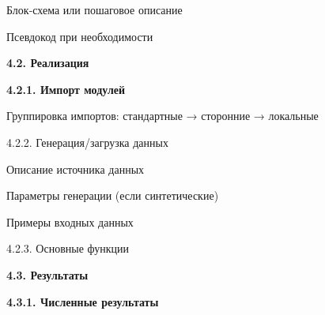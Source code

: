 \documentclass{article}%
\begin{document}
\begin{flushleft}%
Блок-схема или пошаговое описание%
%
\end{flushleft}%
\begin{flushleft}%
Псевдокод при необходимости%
%
\end{flushleft}%
\begin{flushleft}%
\textbf{4.2. Реализация}%
%
\end{flushleft}%
\begin{flushleft}%
\textbf{4.2.1. Импорт модулей}%
%
\end{flushleft}%
\begin{flushleft}%
Группировка импортов: стандартные → сторонние → локальные%
%
\end{flushleft}%
\begin{flushleft}%
4.2.2. Генерация/загрузка данных%
%
\end{flushleft}%
\begin{flushleft}%
Описание источника данных%
%
\end{flushleft}%
\begin{flushleft}%
Параметры генерации (если синтетические)%
%
\end{flushleft}%
\begin{flushleft}%
Примеры входных данных%
%
\end{flushleft}%
\begin{flushleft}%
4.2.3. Основные функции%
%
\end{flushleft}%
\begin{flushleft}%
\textbf{4.3. Результаты}%
%
\end{flushleft}%
\begin{flushleft}%
\textbf{4.3.1. Численные результаты}%
%
\end{flushleft}%
\end{document}
